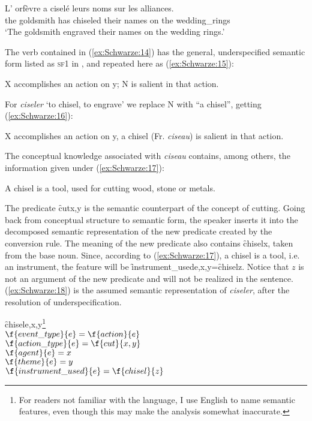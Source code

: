 \documentclass[output=paper]{langsci/langscibook}
\begin{document}
\ea\label{ex:Schwarze:14} \gll L' orfèvre a ciselé leurs noms sur les alliances.\\
the goldsmith has chiseled their names on the {wedding\_rings}\\
\glt `The goldsmith engraved their names on the wedding rings.'\\
\z

The verb contained in (\ref{ex:Schwarze:14}) has the general, underspecified semantic form listed as \textsc{sf}1 in , and repeated here as (\ref{ex:Schwarze:15}):

\ea\label{ex:Schwarze:15} X accomplishes an action on y; N is salient in that action.
\z

For \emph{ciseler} `to chisel, to engrave' we replace N with \enquote{a chisel},
getting (\ref{ex:Schwarze:16}):

\ea\label{ex:Schwarze:16}
 X accomplishes an action on y, a chisel (Fr. \emph{ciseau}) is salient in that action.
\z

The conceptual knowledge associated with \emph{ciseau} contains, among others, the information given under (\ref{ex:Schwarze:17}):

\ea\label{ex:Schwarze:17}
A chisel is a tool, used for cutting wood, stone or metals.
\z

The predicate \f{cut}{x,y} is the semantic counterpart of the concept of cutting. Going back from conceptual structure to semantic form, the speaker inserts it into the decomposed semantic representation of the new predicate created by the conversion rule. The meaning of the new predicate also contains \f{chisel}{x}, taken from the base noun. Since,
according to (\ref{ex:Schwarze:17}), a chisel is a tool, i.e. an instrument, the feature will be \f{instrument\_used}{e,x,y}=\f{chisel}{z}. Notice that $z$ is not an argument of the new predicate and will not be realized in the sentence.
(\ref{ex:Schwarze:18}) is the assumed semantic representation of \emph{ciseler}, after the resolution of underspecification.

\ea\label{ex:Schwarze:18}
 \lx \ly \f{chisel}{e,x,y}\footnote{For readers not familiar with the  language, I use English to name semantic features, even though this may make the analysis somewhat inaccurate.}\\
$\f{event\_type}{e}=\f{action}{e}$\\
$\f{action\_type}{e}=\f{cut}{x,y}$\\
$\f{agent}{e}=x$\\
$\f{theme}{e}=y$\\
$\f{instrument\_used}{e}=\f{chisel}{z}$\\
\z
\end{document}
